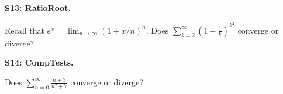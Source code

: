 \documentclass[12pt]{article}
\newcommand{\<}{\left\langle}
\renewcommand{\>}{\right\rangle}
\newcommand{\exerciseHeader}[4]{


  \vspace{0.5em}
  \textbf{#2}
  \vspace{0.5em}

}
\begin{document}
\begin{multicols}{2}
%

\exerciseHeader{2017 July 18}{S13: RatioRoot.}{
Use the ratio and root tests to determine series convergence.
}{2/3}

Recall that \(e^x=\lim_{n\to\infty}(1+x/n)^n\).
Does \(\displaystyle\sum_{k=2}^\infty\left(1-\frac{1}{k}\right)^{k^2}\)
converge or diverge?



%

%

%

\exerciseHeader{2017 July 20}{S14: CompTests.}{
Use the comparison tests to determine series convergence.
}{3/3}

Does \(\displaystyle\sum_{n=0}^\infty\frac{n+3}{n^2+7}\) converge or diverge?




\end{multicols}
\end{document}
